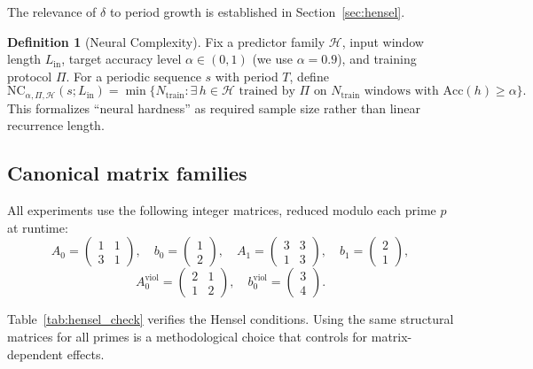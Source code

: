 \documentclass[11pt]{article}
\theoremstyle{plain}
\theoremstyle{definition}
\newtheorem{definition}[theorem]{Definition}
\newcommand{\NC}{\mathrm{NC}}
\begin{document}
The relevance of $\delta$ to period growth is established in Section~\ref{sec:hensel}.

\begin{definition}[Neural Complexity]
\label{def:neural_complexity}
Fix a predictor family $\mathcal{H}$, input window length $L_{\mathrm{in}}$, target accuracy level $\alpha \in (0,1)$ (we use $\alpha=0.9$), and training protocol $\Pi$. For a periodic sequence $s$ with period $T$, define
\[
\NC_{\alpha,\Pi,\mathcal{H}}(s;L_{\mathrm{in}})
= \min\{N_{\mathrm{train}}:\exists\,h\in\mathcal{H}\text{ trained by }\Pi\text{ on }N_{\mathrm{train}}\text{ windows with }\mathrm{Acc}(h)\ge \alpha\}.
\]
This formalizes ``neural hardness'' as required sample size rather than linear recurrence length.
\end{definition}

\subsection{Canonical matrix families}

All experiments use the following integer matrices, reduced modulo each prime $p$ at runtime:
\begin{equation}
  \label{eq:Acanon}
  A_0 = \begin{pmatrix}1&1\\3&1\end{pmatrix},\quad
  b_0 = \begin{pmatrix}1\\2\end{pmatrix},\quad
  A_1 = \begin{pmatrix}3&3\\1&3\end{pmatrix},\quad
  b_1 = \begin{pmatrix}2\\1\end{pmatrix},
\end{equation}
\begin{equation}
  \label{eq:Aviol}
  A_0^{\mathrm{viol}} = \begin{pmatrix}2&1\\1&2\end{pmatrix},\quad
  b_0^{\mathrm{viol}} = \begin{pmatrix}3\\4\end{pmatrix}.
\end{equation}

Table~\ref{tab:hensel_check} verifies the Hensel conditions. Using the same structural matrices for all primes is a methodological choice that controls for matrix-dependent effects.
\end{document}
